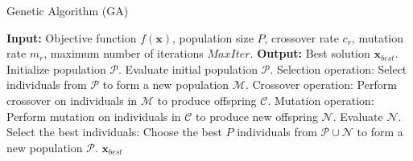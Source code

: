 \documentclass{article}
\begin{document}
	
	\begin{algorithm}
		\caption{Genetic Algorithm (GA)}
		\begin{algorithmic}[1]
			\State \textbf{Input:} Objective function $f(\mathbf{x})$, population size $P$, crossover rate $c_r$, mutation rate $m_r$, maximum number of iterations $MaxIter$.
			\State \textbf{Output:} Best solution $\mathbf{x}_{best}$.
			\State Initialize population $\mathcal{P}$.
			\State Evaluate initial population $\mathcal{P}$.
			\State Selection operation: Select individuals from $\mathcal{P}$ to form a new population $\mathcal{M}$.
			\State Crossover operation: Perform crossover on individuals in $\mathcal{M}$ to produce offspring $\mathcal{C}$.
			\State Mutation operation: Perform mutation on individuals in $\mathcal{C}$ to produce new offspring $\mathcal{N}$.
			\State Evaluate $\mathcal{N}$.
			\State Select the best individuals: Choose the best $P$ individuals from $\mathcal{P} \cup \mathcal{N}$ to form a new population $\mathcal{P}$.
			\EndFor
			\State \Return $\mathbf{x}_{best}$
		\end{algorithmic}
	\end{algorithm}
	
\end{document}
